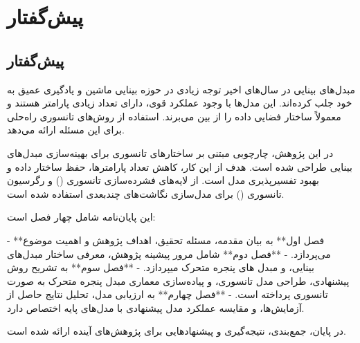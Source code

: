 \chapter*{پیش‌گفتار}
{}



\section*{پیش‌گفتار}

مبدل‌های بینایی در سال‌های اخیر توجه زیادی در حوزه بینایی ماشین و یادگیری عمیق به خود جلب کرده‌اند. این مدل‌ها با وجود عملکرد قوی، دارای تعداد زیادی پارامتر هستند و معمولاً ساختار فضایی داده را از بین می‌برند. استفاده از روش‌های تانسوری راه‌حلی برای این مسئله ارائه می‌دهد.

در این پژوهش، چارچوبی مبتنی بر ساختارهای تانسوری برای بهینه‌سازی مبدل‌های بینایی طراحی شده است. هدف از این کار، کاهش تعداد پارامترها، حفظ ساختار داده و بهبود تفسیرپذیری مدل است. از لایه‌های فشرده‌سازی تانسوری () و رگرسیون تانسوری () برای مدل‌سازی نگاشت‌های چندبعدی استفاده شده است.

این پایان‌نامه شامل چهار فصل است:

- **فصل اول** به بیان مقدمه، مسئله تحقیق، اهداف پژوهش و اهمیت موضوع می‌پردازد.
- **فصل دوم** شامل مرور پیشینه پژوهش، معرفی ساختار مبدل‌های بینایی، و مبدل های پنجره متحرک میپردازد.
- **فصل سوم** به تشریح روش پیشنهادی، طراحی مدل تانسوری، و پیاده‌سازی معماری مبدل پنجره متحرک به صورت تانسوری پرداخته است.
- **فصل چهارم** به ارزیابی مدل، تحلیل نتایج حاصل از آزمایش‌ها، و مقایسه عملکرد مدل پیشنهادی با مدل‌های پایه اختصاص دارد.

در پایان، جمع‌بندی، نتیجه‌گیری و پیشنهادهایی برای پژوهش‌های آینده ارائه شده است.



